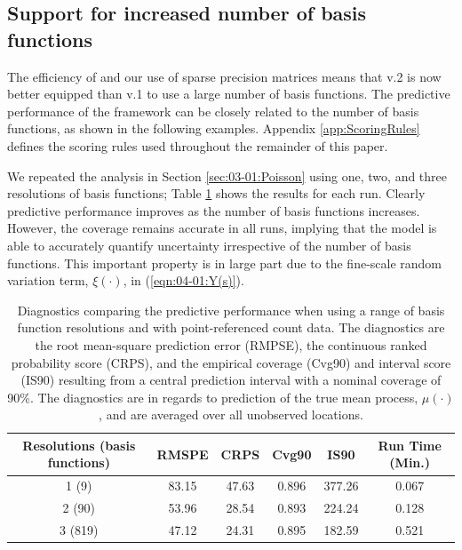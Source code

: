 \documentclass[nojss]{jss}
\begin{document}
\subsection{Support for increased number of basis functions}\label{sec:3:increased_resolution}

The efficiency of  and our use of sparse precision matrices means that  v.2 is now better equipped than  v.1 to use a large number of basis functions. 
The predictive performance of the framework can be closely related to the number of basis functions, as shown in the following examples. 
Appendix \ref{app:ScoringRules} defines the scoring rules used throughout the remainder of this paper. 



We repeated the analysis in Section \ref{sec:03-01:Poisson} using one, two, and three resolutions of basis functions; Table \ref{tab:03-02:PoissonScoringRules} shows the results for each run. 
Clearly predictive performance improves as the number of basis functions increases. However, the coverage remains accurate in all runs, implying that the model is able to accurately quantify uncertainty irrespective of the number of basis functions. 
 This important property is in large part due to the fine-scale random variation term, $\xi(\cdot)$, in (\ref{eqn:04-01:Y(s)}). 
\begin{table}[t!]
    \centering
    \caption{Diagnostics comparing the predictive performance when using a range of basis function resolutions and with point-referenced count data. The diagnostics are the root mean-square prediction error (RMPSE), the continuous ranked probability score (CRPS), and the empirical coverage (Cvg90) and interval score (IS90) resulting from a central prediction interval with a nominal coverage of 90\%. The diagnostics are in regards to prediction of the true mean process, $\mu(\cdot)$, and are averaged over all unobserved locations.
    }
    \label{tab:03-02:PoissonScoringRules}
    \begin{tabular}{cccccc}
    \hline
    Resolutions (basis functions) & RMSPE  & CRPS & Cvg90 & IS90 & Run Time (Min.) \\
    \hline
    1 (9)    & 83.15    & 47.63 & 0.896  & 377.26  &  0.067  \\
    2 (90)   & 53.96    & 28.54 & 0.893  & 224.24 &  0.128   \\
    3 (819)  & 47.12    & 24.31 & 0.895  & 182.59 &  0.521 \\
    \hline
    \end{tabular}
\end{table}
\end{document}
